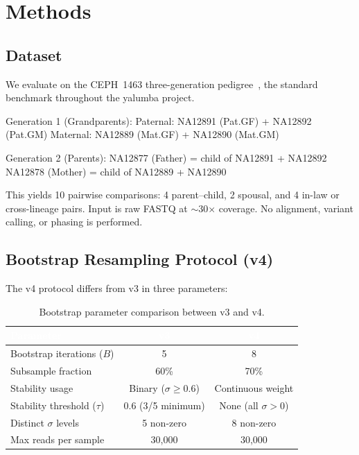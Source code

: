 \documentclass{../yalumba}
\begin{document}
\section{Methods}
\label{sec:methods}

\subsection{Dataset}

We evaluate on the CEPH~1463 three-generation pedigree~\cite{ceph1463,
zook2019giab, 1000genomes2015}, the standard benchmark throughout the yalumba
project.

\begin{pedigree}
Generation 1 (Grandparents):
  Paternal: NA12891 (Pat.GF) + NA12892 (Pat.GM)
  Maternal: NA12889 (Mat.GF) + NA12890 (Mat.GM)

Generation 2 (Parents):
  NA12877 (Father) = child of NA12891 + NA12892
  NA12878 (Mother) = child of NA12889 + NA12890
\end{pedigree}

This yields 10 pairwise comparisons: 4 parent--child, 2 spousal, and 4 in-law
or cross-lineage pairs.  Input is raw FASTQ at $\sim$30$\times$ coverage.
No alignment, variant calling, or phasing is performed.

\subsection{Bootstrap Resampling Protocol (v4)}

The v4 protocol differs from v3 in three parameters:

\begin{table}[H]
  \centering
  \tablestyle
  \caption{Bootstrap parameter comparison between v3 and v4.}
  \label{tab:params}
  \begin{tabular}{lcc}
    \toprule
    \rowcolor{table-header}
    \textcolor{white}{\textbf{Parameter}} &
    \textcolor{white}{\textbf{v3}} &
    \textcolor{white}{\textbf{v4}} \\
    \midrule
    Bootstrap iterations ($B$) & 5 & 8 \\
    Subsample fraction & 60\% & 70\% \\
    Stability usage & Binary ($\sigma \geq 0.6$) & Continuous weight \\
    Stability threshold ($\tau$) & 0.6 (3/5 minimum) & None (all $\sigma > 0$) \\
    Distinct $\sigma$ levels & 5 non-zero & 8 non-zero \\
    Max reads per sample & 30{,}000 & 30{,}000 \\
    \bottomrule
  \end{tabular}
\end{table}
\end{document}
